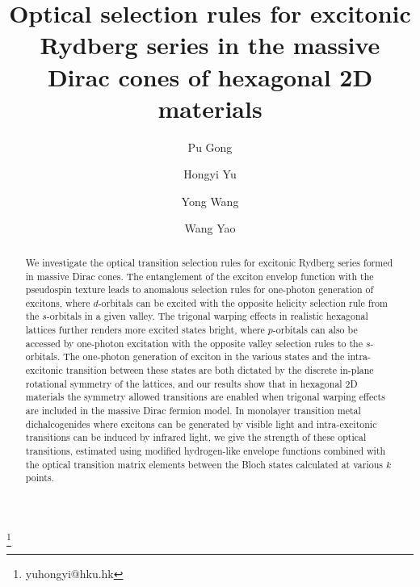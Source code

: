 \documentclass[prb,twocolumn,amsmath,amssymb,superscriptaddress,showpacs]{revtex4}
\begin{document}
\title{Optical selection rules for excitonic Rydberg series in the massive Dirac cones of hexagonal 2D materials}

\author{Pu Gong}

\author{Hongyi Yu} \thanks{yuhongyi@hku.hk}

\author{Yong Wang}

\author{Wang Yao}



\begin{abstract}

We investigate the optical transition selection rules for excitonic Rydberg series formed in massive Dirac cones. The entanglement of the exciton envelop function with the pseudospin texture leads to anomalous selection rules for one-photon generation of excitons, where $d$-orbitals can be excited with the opposite helicity selection rule from the $s$-orbitals in a given valley. The trigonal warping effects in realistic hexagonal lattices further renders more excited states bright, where $p$-orbitals can also be accessed by one-photon excitation with the opposite valley selection rules to the $s$-orbitals. The one-photon generation of exciton in the various states and the intra-excitonic transition between these states are both dictated by the discrete in-plane rotational symmetry of the lattices, and our results show that in hexagonal 2D materials the symmetry allowed transitions are enabled when trigonal warping effects are included in the massive Dirac fermion model. In monolayer transition metal dichalcogenides where excitons can be generated by visible light and intra-excitonic transitions can be induced by infrared light, we give the strength of these optical transitions, estimated using modified hydrogen-like envelope functions combined with the optical transition matrix elements between the Bloch states calculated at various $k$ points.

 \end{abstract}
\end{document}
